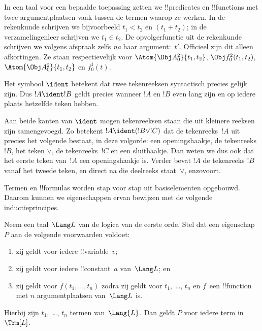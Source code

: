 \documentclass[../../../include/open-logic-section]{subfiles}
\begin{document}
In een taal voor een bepaalde toepassing zetten we !!{predicate}s en
!!{function}s met twee argumentplaatsen vaak tussen de termen waarop ze
werken. In de rekenkunde schrijven we bijvoorbeeld $t_1 < t_2$ en
$(t_1 + t_2)$; in de verzamelingenleer schrijven we $t_1 \in t_2$. De
opvolgerfunctie uit de rekenkunde schrijven we volgens afspraak zelfs
\emph{na} haar argument:~$t'$. Officieel zijn dit alleen afkortingen.
Ze staan respectievelijk voor $\Atom{\Obj A^2_0}{t_1, t_2}$,
$\Obj f^2_0(t_1, t_2)$, $\Atom{\Obj A^2_0}{t_1, t_2}$ en $f^1_0(t)$.

\begin{defn}
Het symbool $\ident$ betekent dat twee tekenreeksen syntactisch precies
gelijk zijn. Dus $!A \ident !B$ geldt precies wanneer $!A$ en $!B$
even lang zijn en op iedere plaats hetzelfde teken hebben.
\end{defn}

Aan beide kanten van $\ident$ mogen tekenreeksen staan die uit kleinere
reeksen zijn samengevoegd. Zo betekent $!A \ident (!B \lor !C)$ dat
de tekenreeks~$!A$ uit precies het volgende bestaat, in deze volgorde:
een openingshaakje, de tekenreeks $!B$, het teken $\lor$, de
tekenreeks~$!C$ en een sluithaakje. Dan weten we dus ook dat het eerste
teken van~$!A$ een openingshaakje is. Verder bevat $!A$ de tekenreeks
$!B$ vanaf het tweede teken, en direct na die deelreeks staat~$\lor$,
enzovoort.

Termen en !!{formula}s worden stap voor stap uit basiselementen
opgebouwd. Daarom kunnen we eigenschappen ervan bewijzen met de volgende
inductieprincipes.

\begin{lem}
    Neem een taal~$\Lang L$ van de logica van de eerste orde.
    Stel dat een eigenschap~$P$ aan de volgende voorwaarden voldoet:
    \begin{enumerate}
        \item zij geldt voor iedere !!{variable}~$v$;
        \item zij geldt voor iedere !!{constant}~$a$ van~$\Lang L$; en
        \item zij geldt voor $f(t_1,\dotsc,t_n)$ zodra zij geldt voor
        $t_1$,~\dots, $t_n$ en $f$~een !!{function} met $n$
            argumentplaatsen van~$\Lang L$ is.
    \end{enumerate}
    Hierbij zijn $t_1$,~\dots, $t_n$ termen van~$\Lang{L}$. Dan geldt
    $P$ voor iedere term in~$\Trm[L]$.
\end{lem}
\end{document}
